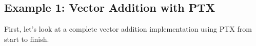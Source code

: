 \subsection{Example 1: Vector Addition with PTX}

First, let's look at a complete vector addition implementation using PTX from start to finish.

